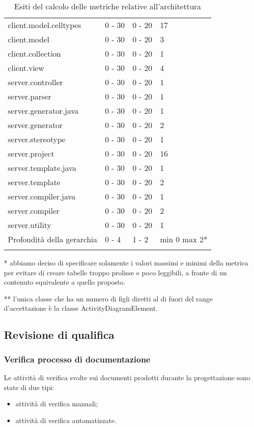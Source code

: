 \begin{longtable}{|p{5.5cm}|p{2.25cm}|p{2.25cm}|p{2.25cm}|}
		client.model.celltypes &0 - 30 &0 - 20 &17\\
		client.model &0 - 30 &0 - 20 &3\\
		client.collection &0 - 30 &0 - 20 &1\\
		client.view &0 - 30 &0 - 20 &4\\
		server.controller &0 - 30 &0 - 20 &1\\
		server.parser &0 - 30 &0 - 20 &1\\
		server.generator.java &0 - 30 &0 - 20 &1\\
		server.generator &0 - 30 &0 - 20 &2\\
		server.stereotype &0 - 30 &0 - 20 &1\\
		server.project &0 - 30 &0 - 20 &16\\
		server.template.java &0 - 30 &0 - 20 &1\\
		server.template &0 - 30 &0 - 20 &2\\
		server.compiler.java &0 - 30 &0 - 20 &1\\
		server.compiler &0 - 30 &0 - 20 &2\\
		server.utility &0 - 30 &0 - 20 &1\\
		\hline
		Profondità della gerarchia &0 - 4 &1 - 2 &min 0 max 2*\\
		\hline
		\caption{Esiti del calcolo delle metriche relative all'architettura}
		\end{longtable}
	* abbiamo deciso di specificare solamente i valori massimi e minimi della metrica per evitare di creare tabelle troppo prolisse e poco leggibili, a fronte di un contenuto equivalente a quello proposto.
	
	** l'unica classe che ha un numero di figli diretti al di fuori del range d'accettazione è la classe ActivityDiagramElement.

\subsection{Revisione di qualifica}
		\subsubsection{Verifica processo di documentazione}
		Le attività di verifica svolte sui documenti prodotti durante la progettazione sono state di due tipi:
		\begin{itemize}		
			\item attività di verifica manuali;
			\item attività di verifica automatizzate.
		\end{itemize}
		
